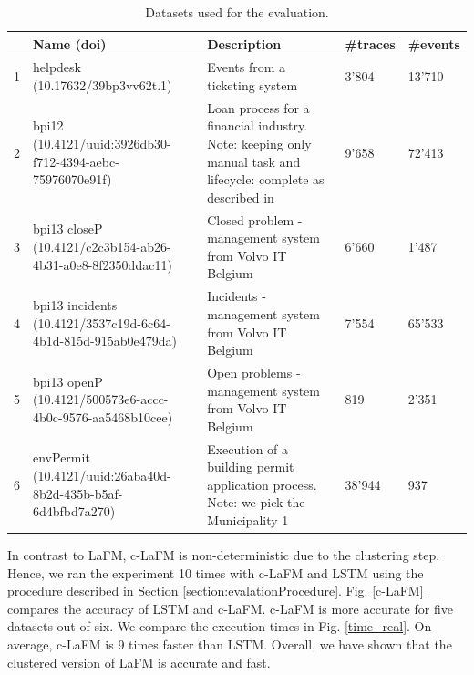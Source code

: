 \documentclass[runningheads]{llncs}
\begin{document}
\begin{table}
	\begin{center}
	\bgroup
	\def\arraystretch{1.3}
	\scriptsize
	    \begin{tabular}{ | p{0.2cm} | p{4.4cm} | p{5.2cm} | p{0.8cm} | p{1cm} | }
	    \hline
	     & Name (doi) & Description & \#traces & \#events \\
	     \hline
1 & helpdesk (10.17632/39bp3vv62t.1) & Events from a ticketing system & 3'804 & 13'710 \\
2 & bpi12 (10.4121/uuid:3926db30-f712-4394-aebc-75976070e91f) & Loan process for a financial industry. Note: keeping only manual task and lifecycle: complete as described in \cite{tax2017predictive} & 9'658 & 72'413  \\
3 & bpi13 closeP (10.4121/c2c3b154-ab26-4b31-a0e8-8f2350ddac11) & Closed problem - management system from Volvo IT Belgium & 6'660 & 1'487  \\
4 & bpi13 incidents (10.4121/3537c19d-6c64-4b1d-815d-915ab0e479da) & Incidents - management system from Volvo IT Belgium & 7'554 &  65'533  \\
5 & bpi13 openP (10.4121/500573e6-accc-4b0c-9576-aa5468b10cee) & Open problems - management system from Volvo IT Belgium & 819 & 2'351  \\
6 & envPermit (10.4121/uuid:26aba40d-8b2d-435b-b5af-6d4bfbd7a270) & Execution of a building permit application process. Note: we pick the Municipality 1 & 38'944 & 937 \\
	    \hline
	    \end{tabular}
	\egroup
\caption{Datasets used for the evaluation.}
	\label{table:datasets}

	\end{center}
	\vspace{-20pt}
\end{table}

In contrast to LaFM, c-LaFM is non-deterministic due to the clustering step. Hence, we ran the experiment 10 times with c-LaFM and LSTM using the procedure described in Section \ref{section:evalationProcedure}. Fig. \ref{c-LaFM} compares the accuracy of LSTM and c-LaFM. c-LaFM is more accurate for five datasets out of six. We compare the execution times in Fig. \ref{time_real}. On average, c-LaFM is 9 times faster than LSTM. Overall, we have shown that the clustered version of LaFM is accurate and fast.
\end{document}
